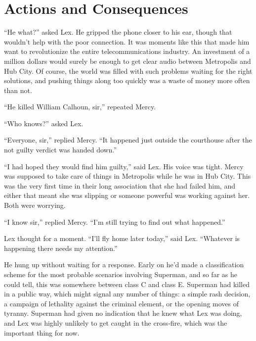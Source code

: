 \hypertarget{actions-and-consequences}{%
\chapter{Actions and Consequences}\label{actions-and-consequences}}

``He what?'' asked Lex. He gripped the phone closer to his ear, though
that wouldn't help with the poor connection. It was moments like this
that made him want to revolutionize the entire telecommunications
industry. An investment of a million dollars would surely be enough to
get clear audio between Metropolis and Hub City. Of course, the world
was filled with such problems waiting for the right solutions, and
pushing things along too quickly was a waste of money more often than
not.

``He killed William Calhoun, sir,'' repeated Mercy.

``Who knows?'' asked Lex.

``Everyone, sir,'' replied Mercy. ``It happened just outside the
courthouse after the not guilty verdict was handed down.''

``I had hoped they would find him guilty,'' said Lex. His voice was
tight. Mercy was supposed to take care of things in Metropolis while he
was in Hub City. This was the very first time in their long association
that she had failed him, and either that meant she was slipping or
someone powerful was working against her. Both were worrying.

``I know sir,'' replied Mercy. ``I'm still trying to find out what
happened.''

Lex thought for a moment. ``I'll fly home later today,'' said Lex.
``Whatever is happening there needs my attention.''

He hung up without waiting for a response. Early on he'd made a
classification scheme for the most probable scenarios involving
Superman, and so far as he could tell, this was somewhere between class
C and class E. Superman had killed in a public way, which might signal
any number of things: a simple rash decision, a campaign of lethality
against the criminal element, or the opening moves of tyranny. Superman
had given no indication that he knew what Lex was doing, and Lex was
highly unlikely to get caught in the cross‐fire, which was the important
thing for now.

